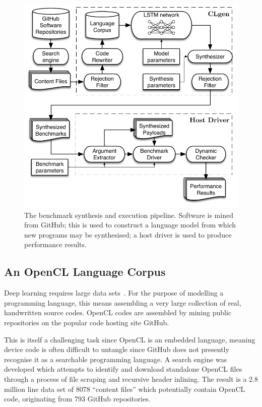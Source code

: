 \begin{figure}
	\centering%
	\includegraphics[width=\columnwidth]{img/pipeline}%
	\caption[Benchmark synthesis and execution pipeline]{%
    The benchmark synthesis and execution pipeline. Software is mined from GitHub; this is used to construct a language model from which new programs may be synthesised; a host driver is used to produce performance results.%
  }%
	\label{fig:clgen-pipeline}
\end{figure}

\subsection{An OpenCL Language Corpus}
\label{subsec:opencl-lang-corpus}

Deep learning requires large data sets~\cite{LeCun2015}. For the purpose of modelling a programming language, this means assembling a very large collection of real, handwritten source codes. OpenCL codes are assembled by mining public repositories on the popular code hosting site GitHub.

This is itself a challenging task since OpenCL is an embedded language, meaning device code is often difficult to untangle since GitHub does not presently recognise it as a searchable programming language. A search engine was developed which attempts to identify and download standalone OpenCL files through a process of file scraping and recursive header inlining. The result is a 2.8 million line data set of 8078 ``content files'' which potentially contain OpenCL code, originating from 793 GitHub repositories.

